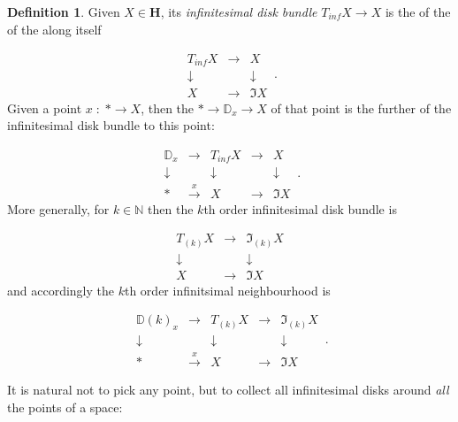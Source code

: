 \documentclass[12pt,titlepage]{article}
\newcommand{\itexarray}[1]{\begin{matrix}#1\end{matrix}}
\theoremstyle{plain}
\theoremstyle{definition}
\newtheorem{defn}{Definition}
\theoremstyle{remark}
\begin{document}
\begin{defn}
\label{InfinitesimalDiskBundle}\hypertarget{InfinitesimalDiskBundle}{}
Given $X \in \mathbf{H}$, its \emph{infinitesimal disk bundle} $T_{inf} X\to X$ is the  of the  of the  along itself

\begin{displaymath}
\itexarray{
    T_{inf} X &\stackrel{}{\longrightarrow}& X
    \\
    \downarrow && \downarrow
    \\
    X &\longrightarrow& \Im X
  }
  \,.
\end{displaymath}
Given a point $x \;\colon\;  \ast \to X$, then the  $\ast \to \mathbb{D}_x \to X$ of that point is the further  of the infinitesimal disk bundle to this point:

\begin{displaymath}
\itexarray{
    \mathbb{D}_x &\longrightarrow & T_{inf} X &\stackrel{}{\longrightarrow}& X
    \\
    \downarrow && \downarrow && \downarrow
    \\
    \ast &\stackrel{x}{\longrightarrow} & X &\longrightarrow& \Im X
  }
  \,.
\end{displaymath}
More generally, for $k \in \mathbb{N}$ then the $k$th order infinitesimal disk bundle is

\begin{displaymath}
\itexarray{
    T_{(k)} X &\stackrel{}{\longrightarrow}& \Im_{(k)} X
    \\
    \downarrow && \downarrow
    \\
    X &\longrightarrow& \Im X
  }
\end{displaymath}
and accordingly the $k$th order infinitsimal neighbourhood is

\begin{displaymath}
\itexarray{
    \mathbb{D}(k)_x &\longrightarrow & T_{(k)} X &\stackrel{}{\longrightarrow}& \Im_{(k)}X
    \\
    \downarrow && \downarrow && \downarrow
    \\
    \ast &\stackrel{x}{\longrightarrow} & X &\longrightarrow& \Im X
  }
  \,.
\end{displaymath}
\end{defn}
It is natural not to pick any point, but to collect all infinitesimal disks around \emph{all} the points of a space:
\end{document}
